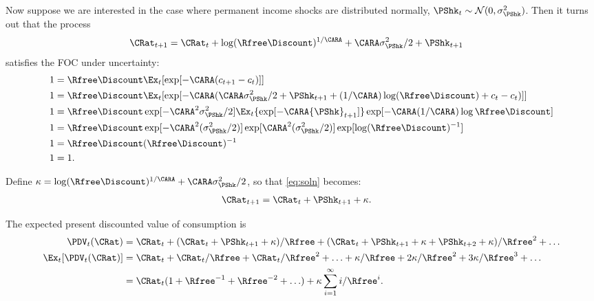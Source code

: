\documentclass{handout}
\begin{document}
Now suppose we are interested in the case where permanent income shocks are distributed 
normally, $\PShk_{t} \sim \mathcal{N}(0,\sigma_{\PShk}^{2})$.  Then it turns
out that the process
\begin{equation}\begin{gathered}\begin{aligned}
        \CRat_{t+1} & =  \CRat_{t} + \log (\Rfree\Discount)^{1/\CARA} + \CARA \sigma^{2}_{\PShk}/2+\PShk_{t+1} \label{eq:soln}
\end{aligned}\end{gathered}\end{equation}
satisfies the FOC under uncertainty:
\begin{equation}\begin{gathered}\begin{aligned}
    1 & =  \Rfree \Discount \Ex_{t}[\exp[-\CARA ({c}_{t+1}-c_{t})]]
\\  1 & =  \Rfree \Discount \Ex_{t}[\exp[-\CARA (\CARA \sigma_{\PShk}^{2}/2+{\PShk}_{t+1}+(1/\CARA)\log (\Rfree\Discount) +c_{t}-c_{t})]]    
\\  1 & =  \Rfree \Discount \exp[-\CARA^{2} \sigma_{\PShk}^{2}/2] \Ex_{t} \{\exp[-\CARA {\PShk}_{t+1}]\}\exp[-\CARA (1/\CARA) \log \Rfree\Discount]
\\  1 & =  \Rfree \Discount \exp[-\CARA^{2}(\sigma_{\PShk}^{2}/2)]\exp[\CARA^{2}(\sigma_{\PShk}^{2}/2)]\exp[\log (\Rfree\Discount)^{-1}]
\\  1 & =  \Rfree \Discount (\Rfree\Discount)^{-1}
\\  1 & =  1.
\end{aligned}\end{gathered}\end{equation}

Define $\kappa = \log (\Rfree\Discount)^{1/\CARA} + \CARA \sigma^{2}_{\PShk}/2$, so that
\eqref{eq:soln} becomes:
 \begin{equation}\begin{gathered}\begin{aligned}
        \CRat_{t+1} & =  \CRat_{t} + \PShk_{t+1} + \kappa.
\end{aligned}\end{gathered}\end{equation}

The expected present discounted value of consumption is 
\begin{equation}\begin{gathered}\begin{aligned}
        \PDV_{t}(\CRat) & =  \CRat_{t}+(\CRat_{t}+\PShk_{t+1}+\kappa)/\Rfree + (\CRat_{t}+\PShk_{t+1}+\kappa + \PShk_{t+2} + \kappa)/\Rfree^{2} + \ldots  \nonumber
\\      \Ex_{t}[\PDV_{t}(\CRat)] & =  \CRat_{t}+\CRat_{t}/\Rfree+\CRat_{t}/\Rfree^{2}+ \ldots + \kappa/\Rfree + 2\kappa/\Rfree^{2} + 3\kappa/\Rfree^{3} + \ldots
\\       & =  \CRat_{t}(1+\Rfree^{-1}+\Rfree^{-2}+\ldots) + \kappa \sum_{i=1}^{\infty} i/\Rfree^{i} .
\end{aligned}\end{gathered}\end{equation}
\end{document}
